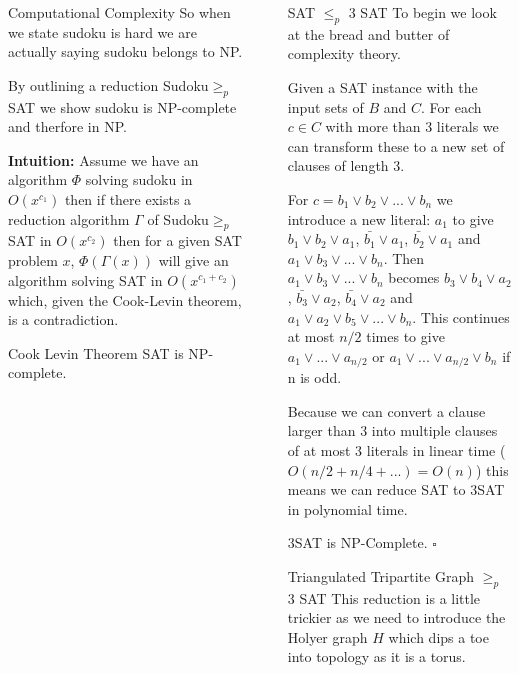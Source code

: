 \documentclass[final]{beamer}
\newlength{\sepwidth}
\newlength{\colwidth}
\newcounter{col}
\newcommand{\separatorcolumn}{\begin{column}{\sepwidth}\end{column}}
\begin{document}
\begin{frame}[t]
\begin{columns}[t]
\begin{column}{\colwidth}
\begin{block}{Computational Complexity}
So when we state sudoku is hard we are actually saying sudoku belongs to NP.

By outlining a reduction Sudoku$ \geq_p $SAT we show sudoku is NP-complete and therfore in NP. 

\textbf{Intuition:} Assume we have an algorithm $\Phi$ solving sudoku in $O(x^{c_1})$ then if there exists a reduction algorithm $\Gamma$ of Sudoku$ \geq_p $SAT in $O(x^{c_2})$  then for a given SAT problem $x$, $\Phi(\Gamma(x))$ will give an algorithm solving SAT in $O(x^{c_1+c_2})$ which, given the Cook-Levin theorem, is a contradiction. 

  \end{block}
  \begin{alertblock}{Cook Levin Theorem}
SAT is NP-complete.
  \end{alertblock}
\end{column}

\separatorcolumn

\begin{column}{\colwidth}
  \begin{block}{SAT $\leq_p$ 3 SAT}
To begin we look at the bread and butter of complexity theory.

Given a SAT instance with the input sets of $B$ and $C$. For each $c \in C$ with more than 3 literals we can transform these to a new set of clauses of length 3. 

For $c = b_1 \lor b_2 \lor ... \lor b_n$ we introduce a new literal: $a_1$ to give $b_1 \lor b_2 \lor a_1$, $\bar{b_1} \lor a_1$, $\bar{b_2} \lor a_1$ and $a_1 \lor b_3 \lor ... \lor b_n$. Then $a_1 \lor b_3 \lor ... \lor b_n$ becomes $b_3 \lor b_4 \lor a_2$, $\bar{b_3} \lor a_2$, $\bar{b_4} \lor a_2$ and $a_1 \lor a_2 \lor b_5 \lor ... \lor b_n$. This continues at most $n/2$ times to give $a_1 \lor ... \lor a_{n/2}$ or $a_1 \lor ... \lor a_{n/2} \lor b_n$ if n is odd. 

Because we can convert a clause larger than 3 into multiple clauses of at most 3 literals in linear time ($O(n/2 + n/4 + ...) = O(n)$) this means we can reduce SAT to 3SAT in polynomial time. 

3SAT is NP-Complete. $\square$

  \end{block}
  \begin{block}{Triangulated Tripartite Graph $\geq_p$ 3 SAT}
This reduction is a little trickier as we need to introduce the Holyer graph $H$ which dips a toe into topology as it is a torus.


\end{block}
\end{column}
\end{columns}
\end{frame}
\end{document}

